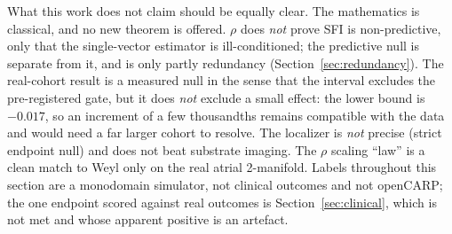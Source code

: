 \documentclass[11pt]{article}
\theoremstyle{definition}
\newcommand{\rhoval}{\rho}
\begin{document}
What this work does not claim should be equally clear. The mathematics is
classical, and no new theorem is offered.
$\rhoval$ does \emph{not} prove SFI is non-predictive, only that the
single-vector estimator is ill-conditioned; the predictive null is separate from
it, and is only partly redundancy (Section~\ref{sec:redundancy}). The real-cohort
result is a measured null in the sense that the interval excludes the
pre-registered gate, but it does \emph{not} exclude a small effect: the lower
bound is $-0.017$, so an increment of a few thousandths remains compatible with
the data and would need a far larger cohort to resolve. The localizer is
\emph{not} precise (strict endpoint null) and does not beat substrate imaging.
The $\rhoval$ scaling ``law'' is a clean match
to Weyl only on the real atrial 2-manifold. Labels throughout this section are a
monodomain simulator, not clinical outcomes and not openCARP; the one endpoint
scored against real outcomes is Section~\ref{sec:clinical}, which is not met and
whose apparent positive is an artefact.

\end{document}
